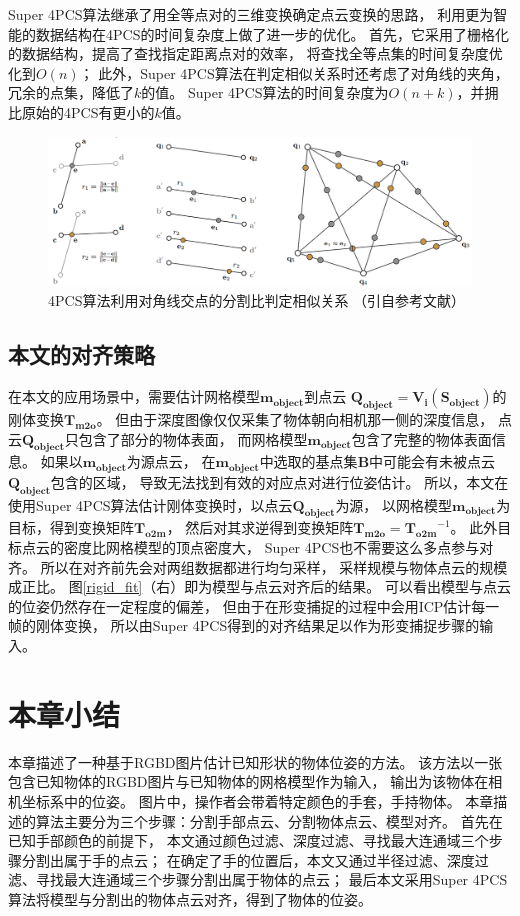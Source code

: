 Super 4PCS算法继承了用全等点对的三维变换确定点云变换的思路，
利用更为智能的数据结构在4PCS的时间复杂度上做了进一步的优化。
首先，它采用了栅格化的数据结构，提高了查找指定距离点对的效率，
将查找全等点集的时间复杂度优化到$O(n)$；
此外，Super 4PCS算法在判定相似关系时还考虑了对角线的夹角，
冗余的点集，降低了$k$的值。
Super 4PCS算法的时间复杂度为$O(n+k)$，并拥比原始的4PCS有更小的$k$值。
\begin{figure}
    \centering
    \includegraphics[width = \textwidth]{./Pictures/4PCS.png}
    \caption{
        4PCS算法利用对角线交点的分割比判定相似关系
        （引自参考文献\cite{aiger20084}）
        }
    \label{4pcs}
\end{figure}
\subsection{本文的对齐策略}
在本文的应用场景中，需要估计网格模型$\bm{m_{object}}$到点云
$\bm{Q_{object}} = \bm{V_i}(\bm{S_{object}})$的刚体变换$\bm{T_{m2o}}$。
但由于深度图像仅仅采集了物体朝向相机那一侧的深度信息，
点云$\bm{Q_{object}}$只包含了部分的物体表面，
而网格模型$\bm{m_{object}}$包含了完整的物体表面信息。
如果以$\bm{m_{object}}$为源点云，
在$\bm{m_{object}}$中选取的基点集$\bm{B}$中可能会有未被点云$\bm{Q_{object}}$包含的区域，
导致无法找到有效的对应点对进行位姿估计。
所以，本文在使用Super 4PCS算法估计刚体变换时，以点云$\bm{Q_{object}}$为源，
以网格模型$\bm{m_{object}}$为目标，得到变换矩阵$\bm{T_{o2m}}$，
然后对其求逆得到变换矩阵${\bm{T_{m2o}}=\bm{T_{o2m}}}^{-1}$。
此外目标点云的密度比网格模型的顶点密度大，
Super 4PCS也不需要这么多点参与对齐。
所以在对齐前先会对两组数据都进行均匀采样，
采样规模与物体点云的规模成正比。
图\ref{rigid_fit}（右）即为模型与点云对齐后的结果。
可以看出模型与点云的位姿仍然存在一定程度的偏差，
但由于在形变捕捉的过程中会用ICP估计每一帧的刚体变换，
所以由Super 4PCS得到的对齐结果足以作为形变捕捉步骤的输入。
\section{本章小结}
本章描述了一种基于RGBD图片估计已知形状的物体位姿的方法。
该方法以一张包含已知物体的RGBD图片与已知物体的网格模型作为输入，
输出为该物体在相机坐标系中的位姿。
图片中，操作者会带着特定颜色的手套，手持物体。
本章描述的算法主要分为三个步骤：分割手部点云、分割物体点云、模型对齐。
首先在已知手部颜色的前提下，
本文通过颜色过滤、深度过滤、寻找最大连通域三个步骤分割出属于手的点云；
在确定了手的位置后，本文又通过半径过滤、深度过滤、寻找最大连通域三个步骤分割出属于物体的点云；
最后本文采用Super 4PCS算法将模型与分割出的物体点云对齐，得到了物体的位姿。

